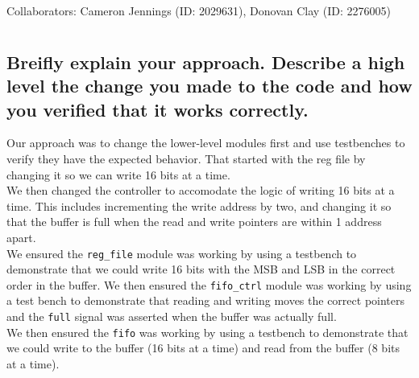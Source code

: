 \documentclass[12pt]{article}
\newcommand{\collaborators}{Cameron Jennings (ID: 2029631), Donovan Clay (ID: 2276005)}
\newcommand{\listcollaborators}{Collaborators: \collaborators}
\renewcommand*{\thesection}{Question \arabic{section}.}
\newenvironment{subquestion}[1]{\subsection{#1}
\begin{tcolorbox}[colback=blue!2!white,colframe=blue!20!white]}{\end{tcolorbox}}
\begin{document}
    \setcounter{tocdepth}{1}
    \begin{center}\label{beginning}
        \tableofcontents 
    \end{center}

    \begin{center}
        \listcollaborators
    \end{center}

    \titleformat{\section}{\normalfont\fontsize{17.28}{15}\bfseries\raggedright}{\thesection}{1em}{}
    \newpage

    \section{}
        \begin{subquestion}{Breifly explain your approach. Describe a high level the change you made to the code and how you verified that it works correctly.}
            Our approach was to change the lower-level modules first and use testbenches to verify they have the expected behavior. That started with the reg file by changing it so we can write 16 bits at a time. \\
            
            We then changed the controller to accomodate the logic of writing 16 bits at a time. This includes incrementing the write address by two, and changing it so that the buffer is full when the read and write pointers are within 1 address apart. \\

            We ensured the \texttt{reg\_file} module was working by using a testbench to demonstrate that we could write 16 bits with the MSB and LSB in the correct order in the buffer. We then ensured the \texttt{fifo\_ctrl} module was working by using a test bench to demonstrate that reading and writing moves the correct pointers and the \texttt{full} signal was asserted when the buffer was actually full. \\
            
            We then ensured the \texttt{fifo} was working by using a testbench to demonstrate that we could write to the buffer (16 bits at a time) and read from the buffer (8 bits at a time).
        \end{subquestion}
\end{document}

